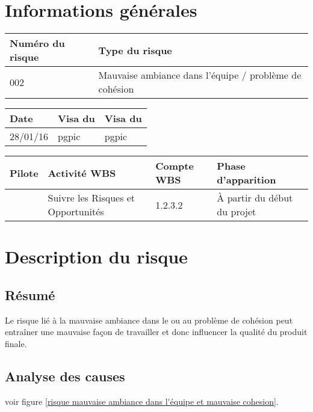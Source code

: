 \section*{Informations générales}

\begin{table}[H]
\centering
	\begin{tabularx}{16.8cm}{|X|X|}
	\hline
	\rowcolor{gray!40} Numéro du risque & Type du risque \\
	\hline
	002 & Mauvaise ambiance dans l'équipe / problème de cohésion \\
	\hline
	\end{tabularx}
\end{table}

\begin{table}[H]
\centering
	\begin{tabularx}{16.8cm}{|X|X|X|}
	\hline
	\rowcolor{gray!40} Date & Visa du \RQ & Visa du \CP \\
	\hline
	 28/01/16 & pgpic & pgpic \\
	\hline
	\end{tabularx}
\end{table}

\begin{table}[H]
\centering
	\begin{tabularx}{16.8cm}{|X|X|X|X|}
	\hline
	\rowcolor{gray!40} Pilote & Activité WBS & Compte WBS & Phase d'apparition \\
	\hline
	 \Michel & Suivre les Risques et Opportunités & 1.2.3.2 & À partir du début du projet\\
	\hline
	\end{tabularx}
\end{table}

\section*{Description du risque}

\subsection*{Résumé}
	Le risque lié à la mauvaise ambiance dans le \PICCourt{} ou au problème de cohésion  peut entraîner une mauvaise façon de travailler et donc influencer la qualité du produit finale.
	
\subsection*{Analyse des causes}
	voir figure \ref{risque mauvaise ambiance dans l'équipe et mauvaise cohesion}. 

